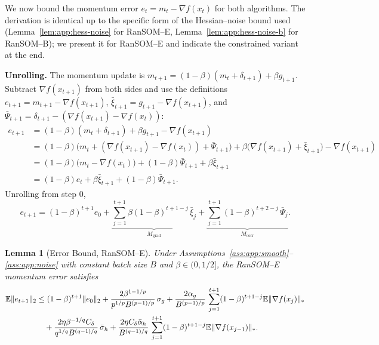\documentclass{article}
\theoremstyle{plain}
\newtheorem{lemma}[theorem]{Lemma}
\theoremstyle{definition}
\theoremstyle{remark}
\begin{document}
We now bound the momentum error $e_t = m_t - \nabla f(x_t)$ for both
algorithms. The derivation is identical up to the specific form of the
Hessian--noise bound used (Lemma~\ref{lem:app:hess-noise} for RanSOM--E,
Lemma~\ref{lem:app:hess-noise-b} for RanSOM--B); we present it for
RanSOM--E and indicate the constrained variant at the end.

\smallskip\noindent\textbf{Unrolling.}
The momentum update is $m_{t+1} = (1-\beta)(m_t + \delta_{t+1}) + \beta
g_{t+1}$. Subtract $\nabla f(x_{t+1})$ from both sides and use the
definitions $e_{t+1} = m_{t+1} - \nabla f(x_{t+1})$,
$\bar\xi_{t+1} = g_{t+1} - \nabla f(x_{t+1})$, and
$\bar\Psi_{t+1} = \delta_{t+1} - (\nabla f(x_{t+1}) - \nabla f(x_t))$:
\begin{align*}
  e_{t+1}
  &= (1-\beta)(m_t + \delta_{t+1}) + \beta g_{t+1} - \nabla f(x_{t+1})
  \\
  &= (1-\beta)\bigl(m_t + (\nabla f(x_{t+1}) - \nabla f(x_t)) + \bar\Psi_{t+1}\bigr)
    + \beta\bigl(\nabla f(x_{t+1}) + \bar\xi_{t+1}\bigr) - \nabla f(x_{t+1})
  \\
  &= (1-\beta)\bigl(m_t - \nabla f(x_t)\bigr) + (1-\beta)\bar\Psi_{t+1}
    + \beta \bar\xi_{t+1}
  \\
  &= (1-\beta) e_t + \beta \bar\xi_{t+1} + (1-\beta)\bar\Psi_{t+1}.
\end{align*}
Unrolling from step $0$,
\begin{equation}
  e_{t+1} = (1-\beta)^{t+1} e_0
    + \underbrace{\sum_{j=1}^{t+1} \beta(1-\beta)^{t+1-j}\, \bar\xi_j}_{M_{\mathrm{grad}}}
    + \underbrace{\sum_{j=1}^{t+1} (1-\beta)^{t+2-j}\, \bar\Psi_j}_{M_{\mathrm{corr}}}.
  \label{eq:app:e-unrolled}
\end{equation}

\begin{lemma}[Error Bound, RanSOM--E]
\label{lem:app:error}
Under Assumptions~\ref{ass:app:smooth}--\ref{ass:app:noise} with constant
batch size $B$ and $\beta \in (0, 1/2]$, the RanSOM--E momentum error
satisfies
\begin{align}
  \mathbb{E}\|e_{t+1}\|_2
  &\leq (1-\beta)^{t+1}\|e_0\|_2
    + \frac{2\beta^{1-1/p}}{p^{1/p} B^{(p-1)/p}}\,\sigma_g
    + \frac{2\alpha_g}{B^{(p-1)/p}}\,
      \sum_{j=1}^{t+1}(1-\beta)^{t+1-j}\mathbb{E}\|\nabla f(x_j)\|_*
  \notag \\
  &\quad + \frac{2\eta\beta^{-1/q} C_\delta}{q^{1/q} B^{(q-1)/q}}\, \bar\sigma_h
    + \frac{2\eta C_\delta \bar\alpha_h}{B^{(q-1)/q}}\,
      \sum_{j=1}^{t+1}(1-\beta)^{t+1-j}\mathbb{E}\|\nabla f(x_{j-1})\|_*.
  \label{eq:app:error-bound}
\end{align}
\end{lemma}
\end{document}
